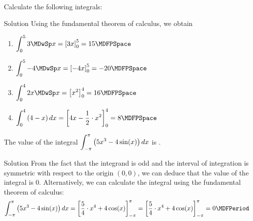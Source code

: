 \begin{MExercises}
\begin{MExercise}
Calculate the following integrals:
\begin{MExerciseItems}
\item{}
\item{}
\item{}
\item{}
\end{MExerciseItems}
\begin{MHint}{Solution}
Using the fundamental theorem of calculus, we obtain
\begin{enumerate}
\item $\displaystyle \int_{0}^{5} 3 \MDwSp x %
= \left[ 3 x \right]_0^5 = 15\MDFPSpace$
%
\item $\displaystyle \int_{0}^{5} -4 \MDwSp x %
= \left[ -4 x \right]_0^5 = -20\MDFPSpace$
%
\item $\displaystyle \int_{0}^{4} 2 x \MDwSp x %
= \left[ x^2 \right]_0^4 = 16\MDFPSpace$
%
\item $\displaystyle \int_{0}^{4} \left(4 - x\right) \MD x %
= \left[ 4 x - \frac{1}{2} \cdot x^2 \right]_0^4 = 8\MDFPSpace$
%
\end{enumerate}
\end{MHint}
\end{MExercise}


\begin{MExercise}
The value of the integral
$\displaystyle \int_{-\pi}^{\pi} \left(5 x^3 - 4 \sin(x)\right) d x$
is .
\begin{MHint}{Solution}
From the fact that the integrand is odd and the interval of integration is 
symmetric with respect to the origin $(0,0)$, we can deduce that the value of the 
integral is $0$. Alternatively, we can calculate the integral using the fundamental theorem 
of calculus:
\[
\int_{-\pi}^{\pi} \left(5 x^3 - 4 \sin(x)\right) \MD x %
= \left[ \frac{5}{4} \cdot x^4 + 4 \cos(x) \right]_{-\pi}^{\pi} %
= \left[ \frac{5}{4} \cdot x^4 + 4 \cos(x) \right]_{-\pi}^{\pi} %
= 0\MDFPeriod %
\]
\end{MHint}
\end{MExercise}



\end{MExercises}
